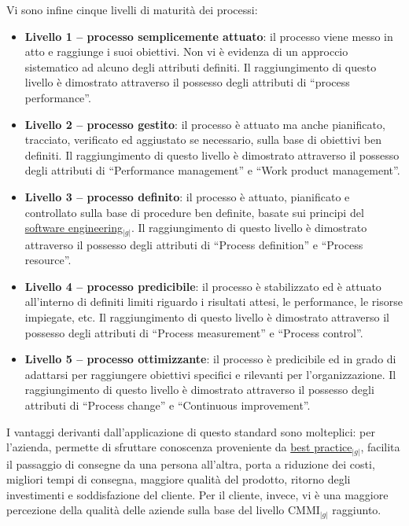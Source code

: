 {	Vi sono infine cinque livelli di maturità dei processi:
	\begin{itemize}
	    \item \textbf{Livello 1 – processo semplicemente attuato}: il processo viene messo in atto e raggiunge i suoi obiettivi. Non vi è evidenza di un approccio sistematico ad alcuno degli 
		  attributi definiti. Il raggiungimento di questo livello è dimostrato attraverso il possesso degli attributi di “process performance”.
	    \item \textbf{Livello 2 – processo gestito}: il processo è attuato ma anche pianificato, tracciato, verificato ed aggiustato se necessario, sulla base di obiettivi ben definiti. Il 
		  raggiungimento di questo livello è dimostrato attraverso il possesso degli attributi di “Performance management” e “Work product management”.
	    \item \textbf{Livello 3 – processo definito}: il processo è attuato, pianificato e controllato sulla base di procedure ben definite, basate sui principi del \underline{software engineering}$_{|g|}$. Il 
		  raggiungimento di questo livello è dimostrato attraverso il possesso degli attributi di  “Process definition” e “Process resource”.
	    \item \textbf{Livello  4 – processo predicibile}: il processo  è stabilizzato ed è attuato all’interno di definiti limiti riguardo i risultati attesi, le performance, le risorse impiegate, etc. 
		  Il raggiungimento di questo livello è dimostrato attraverso il possesso degli attributi di “Process measurement” e “Process control”.
	    \item \textbf{Livello 5 – processo ottimizzante}: il processo  è predicibile ed in grado di adattarsi per raggiungere obiettivi specifici e rilevanti per l'organizzazione. Il raggiungimento di questo 
		  livello è dimostrato attraverso il possesso degli attributi di  “Process change” e “Continuous improvement”.
	\end{itemize}
	I vantaggi derivanti dall’applicazione di questo standard sono molteplici: per l’azienda, permette di sfruttare conoscenza proveniente da \underline{best practice}$_{|g|}$, facilita il passaggio di consegne da una persona 
	all’altra, porta a riduzione dei costi, migliori tempi di consegna, maggiore qualità del prodotto, ritorno degli investimenti e soddisfazione del cliente. Per il cliente, invece, vi è una maggiore percezione 
	della qualità delle aziende sulla base del livello CMMI$_{|g|}$ raggiunto.
    }
    
